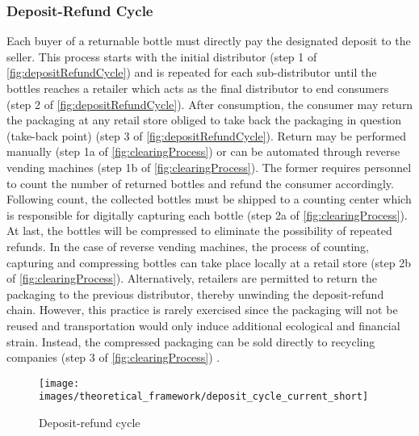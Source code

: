 \subsubsection{Deposit-Refund Cycle}
\label{sec:depositRefundCycle}
Each buyer of a returnable bottle must directly pay the designated deposit to the seller. This process starts with the initial distributor (step 1 of \autoref{fig:depositRefundCycle}) and is repeated for each sub-distributor until the bottles reaches a retailer which acts as the final distributor to end consumers (step 2 of \autoref{fig:depositRefundCycle}). After consumption, the consumer may return the packaging at any retail store obliged to take back the packaging in question (take-back point) (step 3 of \autoref{fig:depositRefundCycle}). Return may be performed manually (step 1a of \autoref{fig:clearingProcess}) or can be automated through reverse vending machines (step 1b of \autoref{fig:clearingProcess}). The former requires personnel to count the number of returned bottles and refund the consumer accordingly. Following count, the collected bottles must be shipped to a counting center which is responsible for digitally capturing each bottle (step 2a of \autoref{fig:clearingProcess}). At last, the bottles will be compressed to eliminate the possibility of repeated refunds. In the case of reverse vending machines, the process of counting, capturing and compressing bottles can take place locally at a retail store (step 2b of \autoref{fig:clearingProcess}). Alternatively, retailers are permitted to return the packaging to the previous distributor, thereby unwinding the deposit-refund chain. However, this practice is rarely exercised since the packaging will not be reused and transportation would only induce additional ecological and financial strain. Instead, the compressed packaging can be sold directly to recycling companies (step 3 of \autoref{fig:clearingProcess}) \cite[p.~16-17]{Hartlep2011Recycling} \cite{reiling}.  

\begin{figure}[hbt]
  \centering
  \texttt{[image: images/theoretical\_framework/deposit\_cycle\_current\_short]}
  \caption[Deposit-refund cycle]{Deposit-refund cycle \cite[p.~14]{Hartlep2011Recycling}}
  \label{fig:depositRefundCycle}
\end{figure}

